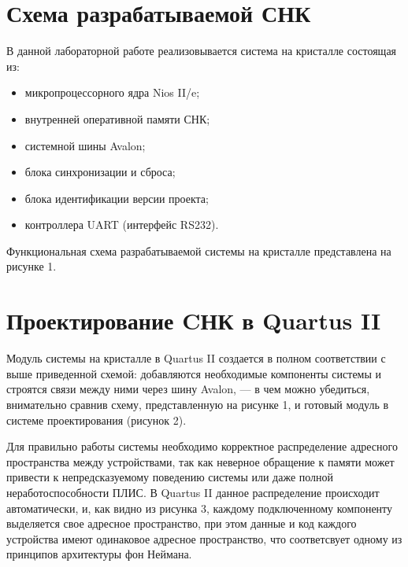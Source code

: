 \section*{Схема разрабатываемой СНК}

В данной лабораторной работе реализовывается система на кристалле состоящая из:
\begin{itemize}[left=\parindent]
    \item микропроцессорного ядра Nios II/e;
    \item внутренней оперативной памяти СНК;
    \item системной шины Avalon;
    \item блока синхронизации и сброса;
    \item блока идентификации версии проекта;
    \item контроллера UART (интерфейс RS232).
\end{itemize}

Функциональная схема разрабатываемой системы на кристалле представлена на
рисунке 1.


\newpage
\section*{Проектирование CНК в Quartus II}

Модуль системы на кристалле в Quartus II создается в полном соответствии с выше
приведенной схемой: добавляются необходимые компоненты системы и строятся связи
между ними через шину Avalon, --- в чем можно убедиться, внимательно сравнив
схему, представленную на рисунке 1, и готовый модуль в системе проектирования
(рисунок 2).



Для правильно работы системы необходимо корректное распределение адресного
пространства между устройствами, так как неверное обращение к памяти может
привести к непредсказуемому поведению системы или даже полной
неработоспособности ПЛИС. В Quartus II данное распределение происходит
автоматически, и, как видно из рисунка 3, каждому подключенному компоненту
выделяется свое адресное пространство, при этом данные и код каждого устройства
имеют одинаковое адресное пространство, что соответсвует одному из принципов
архитектуры фон Неймана.

